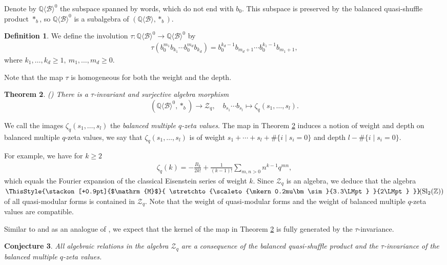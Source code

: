 \documentclass[12pt,reqno]{amsart}
\newtheorem{thm}{Theorem}[section]
\newtheorem{con}[thm]{Conjecture}
\numberwithin{equation}{section}
\theoremstyle{definition}
\newtheorem{defi}[thm]{Definition}
\newcommand{\medtildeM}{ \ThisStyle{\stackon[+0.9pt]{$\mathrm{M}$}{ \stretchto{\scaleto{\mkern0.2mu\bm\sim}{3.3\LMpt} }{2\LMpt} }}}
\newcommand{\ZZ}{\mathbb{Z}}
\newcommand{\QQ}{\mathbb{Q}}
\newcommand{\quasimod}{\ensuremath{\medtildeM\!(\operatorname{Sl}_2(\ZZ))}}
\newcommand{\Z}{\mathcal{Z}}
\newcommand{\B}{\mathcal{B}}
\newcommand{\QB}{\QQ\langle \B\rangle}
\begin{document}
Denote by $\QB^0$ the subspace spanned by words, which do not end with $b_0$. This subspace is preserved by the balanced quasi-shuffle product $\ast_b$, so $\QB^0$ is a subalgebra of $(\QB,\ast_b)$.

\begin{defi} \label{def:tau}
	We define the involution $\tau:\QB^0\to \QB^0$ by 
\begin{align*}
	\tau(b_0^{m_1}b_{k_1}\cdots b_0^{m_d}b_{k_d})=b_0^{k_d-1}b_{m_d+1}\cdots b_0^{k_1-1}b_{m_1+1},
\end{align*} 
where $k_1,\ldots,k_d\geq1,\ m_1,\ldots,m_d\geq0$.
\end{defi}

Note that the map $\tau$ is homogeneous for both the weight and the depth.

\begin{thm} \label{thm:bal_qmzv} (\cite{Bu24}) There is a $\tau$-invariant and surjective algebra morphism
	\[(\QB^0,\ast_b)\to \Z_q,\quad b_{s_1}\cdots b_{s_l}\mapsto \zeta_q(s_1,\ldots,s_l).\]
\end{thm}
We call the images $\zeta_q(s_1,\ldots,s_l)$ the \emph{balanced multiple $q$-zeta values}. The map in Theorem \ref{thm:bal_qmzv} induces a notion of weight and depth on balanced multiple $q$-zeta values, we say that $\zeta_q(s_1,\ldots,s_l)$ is of weight $s_1+\cdots+s_l+\#\{i\mid s_i=0\}$ and depth $l-\#\{i\mid s_i=0\}$. 

For example, we have for $k\geq2$
\begin{align*}
\zeta_q(k)=-\frac{B_k}{2k!}+\frac{1}{(k-1)!}\sum_{m,n>0} n^{k-1}q^{mn},
\end{align*}
which equals the Fourier expansion of the classical Eisenstein series of weight $k$. Since $\Z_q$ is an algebra, we deduce that the algebra $\quasimod$ of all quasi-modular forms is contained in $\Z_q$. Note that the weight of quasi-modular forms and the weight of balanced multiple $q$-zeta values are compatible.

Similar to \cite[Remark 6.11.]{BB23} and as an analogue of \cite[Conjecture 1]{IKZ06}, we expect that the kernel of the map in Theorem \ref{thm:bal_qmzv} is fully generated by the $\tau$-invariance.

\begin{con} \label{con:Zq_all_rel} All algebraic relations in the algebra $\Z_q$ are a consequence of the balanced quasi-shuffle product and the $\tau$-invariance of the balanced multiple $q$-zeta values.
\end{con} 
\end{document}
